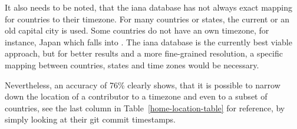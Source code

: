It also needs to be noted, that the \ac{iana} database has not always exact mapping for countries to their timezone.
For many countries or states, the current or an old capital city is used.
Some countries do not have an own timezone, for instance, Japan which falls into .
The \ac{iana} database is the currently best viable approach, but for better results and a more fine-grained resolution, a specific mapping between countries, states and time zones would be necessary.

Nevertheless, an accuracy of 76\% clearly shows, that it is possible to narrow down the location of a contributor to a timezone and even to a subset of countries, see the last column in Table~\ref{home-location-table} for reference, by simply looking at their git commit timestamps.
